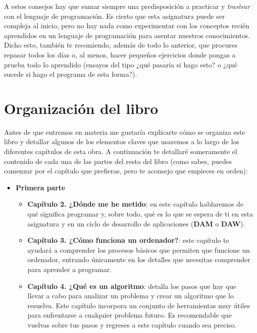 A estos consejos hay que sumar siempre una predisposición a practicar y \textit{trastear} con el lenguaje de programación. Es cierto
que esta asignatura puede ser compleja al inicio, pero no hay nada como experimentar con los conceptos recién aprendidos en un 
lenguaje de programación para asentar nuestros conocimientos. Dicho esto, también te recomiendo, además de todo lo anterior, que
procures repasar todos los días o, al menos, hacer pequeños ejercicios donde pongas a prueba todo lo aprendido (ensayos del tipo 
¿qué pasaría si hago esto? o ¿qué sucede si hago el programa de esta forma?).

\section{Organización del libro}

Antes de que entremos en materia me gustaría explicarte cómo se organiza este libro y detallar algunos de los elementos claves que
usaremos a lo largo de los diferentes capítulos de esta obra. A continuación te detallaré someramente el contenido de cada
una de las partes del resto del libro (como sabes, puedes comenzar por el capítulo que prefieras, pero te aconsejo que empieces 
en orden):

\begin{itemize}
    \item \textbf{Primera parte} {
        \begin{itemize}
            \item \textbf{Capítulo 2. ¿Dónde me he metido}: en este capítulo hablaremos de qué significa programar y, sobre todo, 
            qué es lo que se espera de ti en esta asignatura y en un ciclo de desarrollo de aplicaciones (\textbf{DAM} o \textbf{DAW}).
            \item \textbf{Capítulo 3. ¿Cómo funciona un ordenador?}: este capítulo te ayudará a comprender los procesos básicos que
            permiten que funcione un ordenador, entrando únicamente en los detalles que necesitas comprender para aprender a programar.
            \item \textbf{Capítulo 4. ¿Qué es un algoritmo}: detalla los pasos que hay que llevar a cabo para analizar un problema y
            crear un algoritmo que lo resuelva. Este capítulo incorpora un conjunto de herramientas muy útiles para enfrentarse a
            cualquier problema futuro. Es recomendable que vuelvas sobre tus pasos y regreses a este capítulo cuando sea preciso.
        \end{itemize}
        }

\end{itemize}

